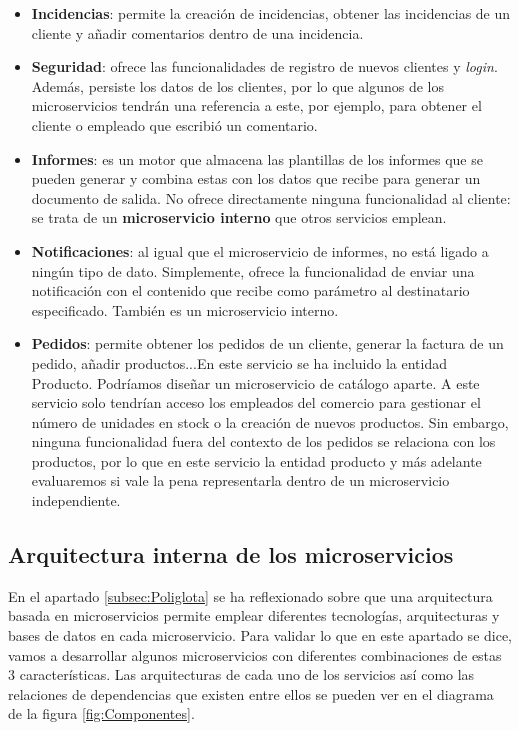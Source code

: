 \documentclass[11pt,spanish,listoffigures]{tfgetsinf}
\begin{document}
\begin{itemize}

\item \textbf{Incidencias}: permite la creación de incidencias, obtener las incidencias de un cliente y añadir comentarios dentro de una incidencia.

\item \textbf{Seguridad}: ofrece las funcionalidades de registro de nuevos clientes y \textit{login}. Además, persiste los datos de los clientes, por lo que algunos de los microservicios tendrán una referencia a este, por ejemplo, para obtener el cliente o empleado que escribió un comentario.

\item \textbf{Informes}: es un motor que almacena las plantillas de los informes que se pueden generar y combina estas con los datos que recibe para generar un documento de salida. No ofrece directamente ninguna funcionalidad al cliente: se trata de un \textbf{microservicio interno} que otros servicios emplean.

\item \textbf{Notificaciones}: al igual que el microservicio de informes, no está ligado a ningún tipo de dato. Simplemente, ofrece la funcionalidad de enviar una notificación con el contenido que recibe como parámetro al destinatario especificado. También es un microservicio interno.

\item \textbf{Pedidos}: permite obtener los pedidos de un cliente, generar la factura de un pedido, añadir productos...En este servicio se ha incluido la entidad Producto. Podríamos diseñar un microservicio de catálogo aparte. A este servicio solo tendrían acceso los empleados del comercio para gestionar el número de unidades en stock o la creación de nuevos productos. Sin embargo, ninguna funcionalidad fuera del contexto de los pedidos se relaciona con los productos, por lo que en este servicio la entidad producto y más adelante evaluaremos si vale la pena representarla dentro de un microservicio independiente. 

\end{itemize}

\subsection{Arquitectura interna de los microservicios}

En el apartado \ref{subsec:Poliglota}  se ha reflexionado sobre que una arquitectura basada en microservicios permite emplear diferentes tecnologías, arquitecturas y bases de datos en cada microservicio. Para validar lo que en este apartado se dice, vamos a desarrollar algunos microservicios con diferentes combinaciones de estas 3 características. Las arquitecturas de cada uno de los servicios así como las relaciones de dependencias que existen entre ellos se pueden ver en el diagrama de la figura \ref{fig:Componentes}.
\end{document}
